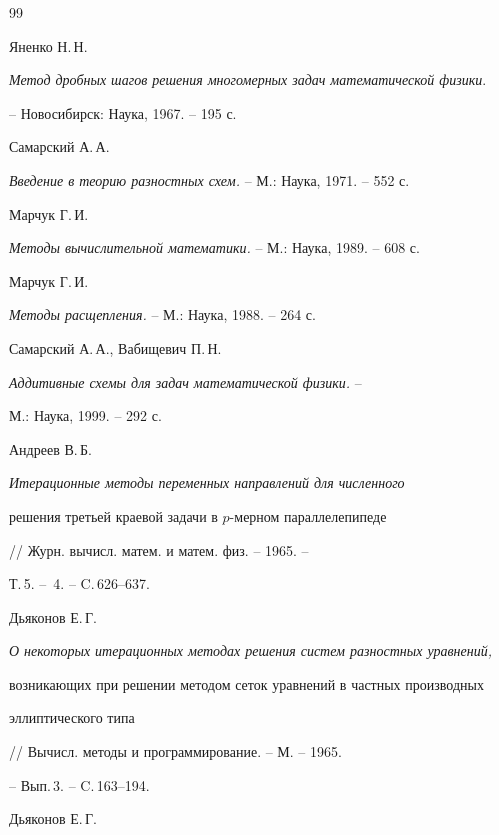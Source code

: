 \begin{thebibliography}{99}







Яненко Н.\,Н.


{\it Метод дробных шагов решения многомерных задач математической физики}.


-- Новосибирск: Наука, 1967. -- 195 с.




Самарский А.\,А.


{\it Введение в теорию разностных схем.} -- М.: Наука, 1971. -- 552 с.




Марчук Г.\,И.


{\it Методы вычислительной математики.} -- М.: Наука, 1989. -- 608 с.




Марчук Г.\,И.


{\it Методы расщепления.} -- М.: Наука, 1988. -- 264 с.




Самарский А.\,А., Вабищевич П.\,Н.


{\it Аддитивные схемы для задач математической физики.} --


М.: Наука, 1999. -- 292 с.




Андреев В.\,Б.


{\it Итерационные методы переменных направлений для численного 


решения третьей краевой задачи в $p$-мерном параллелепипеде}


// Журн. вычисл. матем. и матем. физ. -- 1965. --


Т.\,5. -- \No\,4. -- C.\,626--637.




Дьяконов Е.\,Г.


{\it О некоторых итерационных методах решения систем разностных уравнений,


возникающих при решении методом сеток уравнений в частных производных 


эллиптического типа} 


// Вычисл. методы и программирование. -- М. -- 1965. 


-- Вып.\,3. -- C.\,163--194.




Дьяконов Е.\,Г.



\end{thebibliography}
